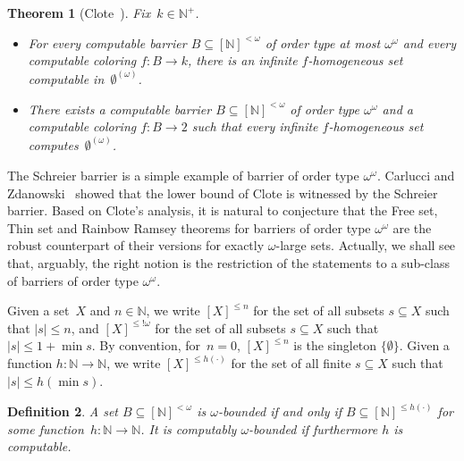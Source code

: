 \documentclass{article}
\newcommand{\NN}[0]{\mathbb{N}}
\newtheorem{theorem}{Theorem}
\numberwithin{theorem}{section}
\newtheorem{definition}[theorem]{Definition}
\newcommand{\ludovic}[1]{\textcolor{blue}{#1}}
\newcommand{\lorenzo}[1]{\textcolor{orange}{#1}}
\begin{document}
\begin{theorem}[Clote~\cite{clote1984recursion}]\label{thm:Clote}
Fix~$k \in \NN^+$.
\begin{itemize}
    \item For every computable barrier $B \subseteq [\NN]^{<\omega}$ of order type at most $\omega^\omega$ and every computable coloring $f : B \to k$, there is an infinite $f$-homogeneous set computable in~$\emptyset^{(\omega)}$.
    \item There exists a computable barrier $B \subseteq [\NN]^{<\omega}$ of order type $\omega^\omega$ and a computable coloring $f : B \to 2$ such that every infinite $f$-homogeneous set computes~$\emptyset^{(\omega)}$.
\end{itemize}
\end{theorem}

The Schreier barrier is a simple example of barrier of order type $\omega^\omega$. Carlucci and Zdanowski~\cite{carlucci2014strength} showed that the lower bound of Clote is witnessed by the Schreier barrier.
Based on Clote's analysis, it is natural to conjecture that the Free set, Thin set and Rainbow Ramsey theorems for barriers of order type $\omega^\omega$ are the robust counterpart of their versions for exactly $\omega$-large sets. Actually, we shall see that, arguably, the right notion is the restriction of the statements to a sub-class of barriers of order type $\omega^\omega$.

Given a set~$X$ and $n \in \NN$, we write $[X]^{\leq n}$ for the set of all subsets $s \subseteq X$ such that $|s| \leq n$, and $[X]^{\leq !\omega}$ for the set of all subsets $s \subseteq X$ such that $|s| \leq 1+\min s$. By convention, for~$n = 0$, $[X]^{\leq n}$ is the singleton $\{\emptyset\}$. Given a function $h : \NN \to \NN$, we write $[X]^{\leq h(\cdot)}$ for the set of all finite $s \subseteq X$ such that $|s| \leq h(\min s)$. %

\begin{definition}
A set $B \subseteq [\NN]^{<\omega}$ is \emph{$\omega$-bounded} if and only if $B \subseteq [\NN]^{\leq h(\cdot)}$ for some function~$h : \NN \to \NN$. It is \emph{computably $\omega$-bounded} if furthermore $h$ is computable.
\end{definition}
\end{document}
